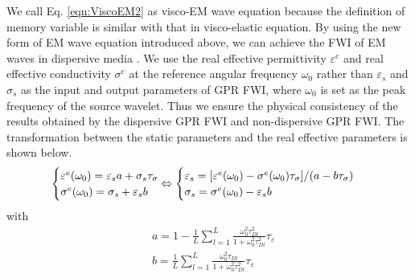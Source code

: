 \documentclass[pdftex,a4paper,parskip,listof=totoc,bibliography=totoc,onehalfspacing,12pt]{scrreprt}
\begin{document}
We call Eq. \ref{eqn:ViscoEM2} as visco-EM wave equation because the definition of memory variable is similar with that in visco-elastic equation. By using the new form of EM wave equation introduced above, we can achieve the FWI of EM waves in dispersive media \citep{qin2020full}. We use the real effective permittivity $\varepsilon^e$ and real effective conductivity $\sigma^e$ at the reference angular frequency $\omega_0$ rather than $\varepsilon_s$ and $\sigma_s$ as the input and output parameters of GPR FWI, where $\omega_0$ is set as the peak frequency of the source wavelet. Thus we ensure the physical consistency of the results obtained by the dispersive GPR FWI and non-dispersive GPR FWI. The transformation between the static parameters and the real effective parameters is shown below.
\begin{equation}
\label{eqn:realEffectiveParameters3}
\begin{cases}
 \varepsilon^e(\omega_0) = \varepsilon_s a + \sigma_s \tau_{\sigma} \\
 \sigma^e(\omega_0) = \sigma_s + \varepsilon_s b 
\end{cases} \hspace{-0.4cm} \Leftrightarrow
\begin{cases} 
 \varepsilon_s = [\varepsilon^e(\omega_0)-\sigma^e(\omega_0)\tau_{\sigma}]/(a-b\tau_{\sigma}) \\
 \sigma_s = \sigma^e(\omega_0) - \varepsilon_s b
 \end{cases}
\end{equation}
with
\begin{equation}
\begin{aligned}
 &a = 1 - \frac{1 }{L} \sum_{l=1}^L {\frac{\omega_0^2\tau_{D l}^2}{1+\omega_0^2\tau_{D l}^2}} \tau_{\varepsilon} \\
 &b =  \frac{ 1 }{L} \sum_{l=1}^L \frac{ \omega_0^2 \tau_{Dl}}{ 1 + \omega_0^2 \tau_{Dl}^2 } \tau_{\varepsilon} 
 \end{aligned}
\end{equation}
\end{document}

